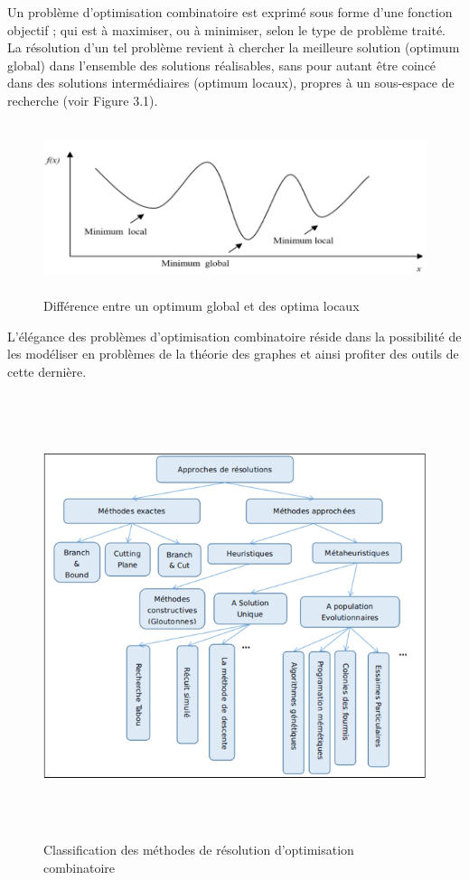 Un problème d’optimisation combinatoire est exprimé sous forme d’une fonction objectif ; qui est à maximiser, ou à minimiser, selon le type de problème traité. La résolution d’un tel problème revient à chercher la meilleure solution (optimum global) dans l’ensemble des solutions réalisables, sans pour autant être coincé dans des solutions intermédiaires (optimum locaux), propres à un sous-espace de recherche (voir Figure 3.1).

\begin{figure}[h]
	\centering
	\includegraphics[width=15cm,height=5cm]{Chap3/1.png}
	\caption{Différence entre un optimum global et des optima locaux}
	\label{fig:CSF}
\end{figure}

L’élégance des problèmes d’optimisation combinatoire réside dans la possibilité de les modéliser en problèmes de la théorie des graphes et ainsi profiter des outils de cette dernière.

\begin{figure}[H]
	\centering
	\includegraphics[width=15cm,height=13cm]{Chap3/2.png}
	\caption{Classification des méthodes de résolution d’optimisation combinatoire}
	\label{fig:CSF}
\end{figure}

